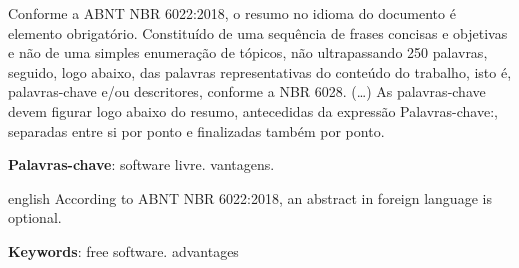 \documentclass[
	article,			%
	12pt,				%
	oneside,			%
	a4paper,			%
	english,			%
	brazil,				%
	sumario=tradicional
	]{abntex2}
\begin{document}

\frenchspacing 


%
%

\imprimircapa





\begin{resumoumacoluna}
 Conforme a ABNT NBR 6022:2018, o resumo no idioma do documento é elemento obrigatório. 
 Constituído de uma sequência de frases concisas e objetivas e não de uma 
 simples enumeração de tópicos, não ultrapassando 250 palavras, seguido, logo 
 abaixo, das palavras representativas do conteúdo do trabalho, isto é, 
 palavras-chave e/ou descritores, conforme a NBR 6028. (\ldots) As 
 palavras-chave devem figurar logo abaixo do resumo, antecedidas da expressão 
 Palavras-chave:, separadas entre si por ponto e finalizadas também por ponto.
 
 \vspace{\onelineskip}
 
 \noindent
 \textbf{Palavras-chave}: software livre. vantagens. 
\end{resumoumacoluna}


\renewcommand{\resumoname}{Abstract}
\begin{resumoumacoluna}
 \begin{otherlanguage*}{english}
   According to ABNT NBR 6022:2018, an abstract in foreign language is optional.

   \vspace{\onelineskip}
 
   \noindent
   \textbf{Keywords}: free software. advantages
 \end{otherlanguage*}  
\end{resumoumacoluna}
\end{document}
